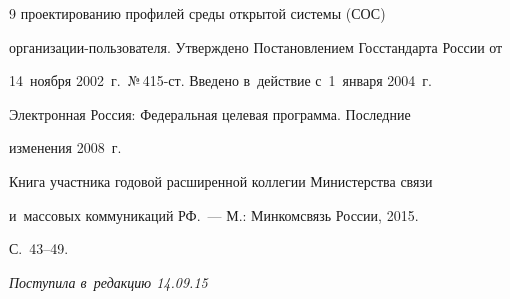 {{\begin{thebibliography}{9}
проектированию профилей среды открытой системы (СОС) 

ор\-га\-ни\-за\-ции-поль\-зо\-ва\-те\-ля. Утверждено Постановлением Госстандарта России от 

14~ноября 2002~г.\ №\,415-ст. Введено в~действие с~1~января 2004~г.


     Электронная Россия: Федеральная целевая программа. Последние 

изменения 2008~г.


     Книга участника годовой расширенной коллегии Министерства связи 

и~массовых коммуникаций РФ.~--- М.: Минкомсвязь России, 2015. 

С.~43--49.

   \end{thebibliography}

} }





\vspace*{-1pt}



\hfill{\small\textit{Поступила в~редакцию 14.09.15}}





















\newpage



\vspace*{-24pt}







\def\tit{REGARDING SOME APPROACHES TO~CREATION OF~GENERALIZED ARCHITECTURE 

OF~RUSSIAN INFORMATION SPACE MEMBERS OF~INFORMATION SYSTEMS}



\def\titkol{Regarding some approaches to~creation of~generalized architecture} 

